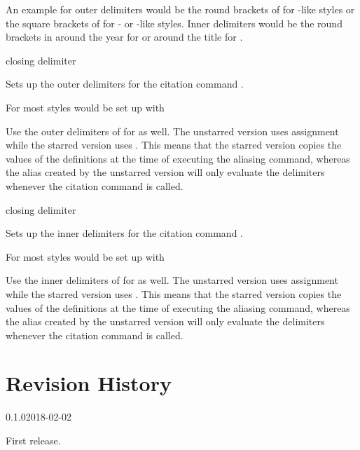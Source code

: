 \documentclass{ltxdockit}
\begin{document}
An example for outer delimiters would be the round brackets of 
for -like styles or the square brackets of  for 
- or -like styles.
Inner delimiters would be the round brackets in  around
the year for  or around the title for .

\begin{ltxsyntax}
        {closing delimiter}

Sets up the outer delimiters for the citation command
.

For most styles  would be set up with
\begin{ltxexample}
\end{ltxexample}


Use the outer delimiters of  for
 as well.
The unstarred version uses  assignment while the starred version uses
. This means that the starred version copies the values of the
definitions at the time of executing the aliasing command,
whereas the alias created by the unstarred version will only evaluate the
delimiters whenever the citation command is called.


        {closing delimiter}

Sets up the inner delimiters for the citation command
.

For most styles  would be set up with
\begin{ltxexample}
\end{ltxexample}


Use the inner delimiters of  for
 as well.
The unstarred version uses  assignment while the starred version uses
. This means that the starred version copies the values of the
definitions at the time of executing the aliasing command,
whereas the alias created by the unstarred version will only evaluate the
delimiters whenever the citation command is called.
\end{ltxsyntax}

\section{Revision History}\label{apx:log}
\begin{changelog}
\begin{release}{0.1.0}{2018-02-02}
\item First release.
\end{release}
\end{changelog}
\end{document}
